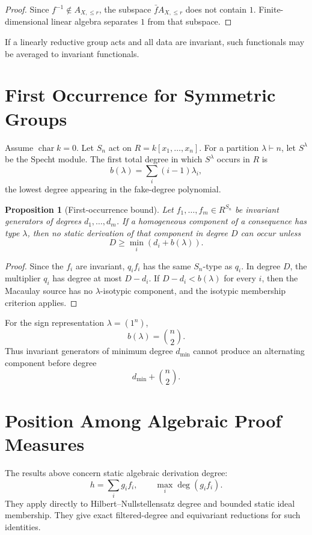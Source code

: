 \documentclass[11pt]{article}
\newtheorem{proposition}[theorem]{Proposition}
\DeclareMathOperator{\charac}{char}
\begin{document}
\begin{proof}
Since \(f^{-1}\notin A_{X,\le r}\), the subspace \(\bar f A_{X,\le r}\) does not contain \(1\). Finite-dimensional linear algebra separates \(1\) from that subspace.
\end{proof}

If a linearly reductive group acts and all data are invariant, such functionals may be averaged to invariant functionals.

\section{First Occurrence for Symmetric Groups}

Assume \(\charac k=0\). Let \(S_n\) act on \(R=k[x_1,\ldots,x_n]\). For a partition \(\lambda\vdash n\), let \(S^\lambda\) be the Specht module. The first total degree in which \(S^\lambda\) occurs in \(R\) is
\[
b(\lambda)=\sum_i(i-1)\lambda_i,
\]
the lowest degree appearing in the fake-degree polynomial.

\begin{proposition}[First-occurrence bound]
Let \(f_1,\ldots,f_m\in R^{S_n}\) be invariant generators of degrees \(d_1,\ldots,d_m\). If a homogeneous component of a consequence has type \(\lambda\), then no static derivation of that component in degree \(D\) can occur unless
\[
D\ge \min_i(d_i+b(\lambda)).
\]
\end{proposition}

\begin{proof}
Since the \(f_i\) are invariant, \(q_if_i\) has the same \(S_n\)-type as \(q_i\). In degree \(D\), the multiplier \(q_i\) has degree at most \(D-d_i\). If \(D-d_i<b(\lambda)\) for every \(i\), then the Macaulay source has no \(\lambda\)-isotypic component, and the isotypic membership criterion applies.
\end{proof}

For the sign representation \(\lambda=(1^n)\),
\[
b(\lambda)=\binom n2.
\]
Thus invariant generators of minimum degree \(d_{\min}\) cannot produce an alternating component before degree
\[
d_{\min}+\binom n2.
\]

\section{Position Among Algebraic Proof Measures}

The results above concern static algebraic derivation degree:
\[
h=\sum_i g_i f_i,\qquad \max_i\deg(g_if_i).
\]
They apply directly to Hilbert--Nullstellensatz degree and bounded static ideal membership. They give exact filtered-degree and equivariant reductions for such identities.
\end{document}
